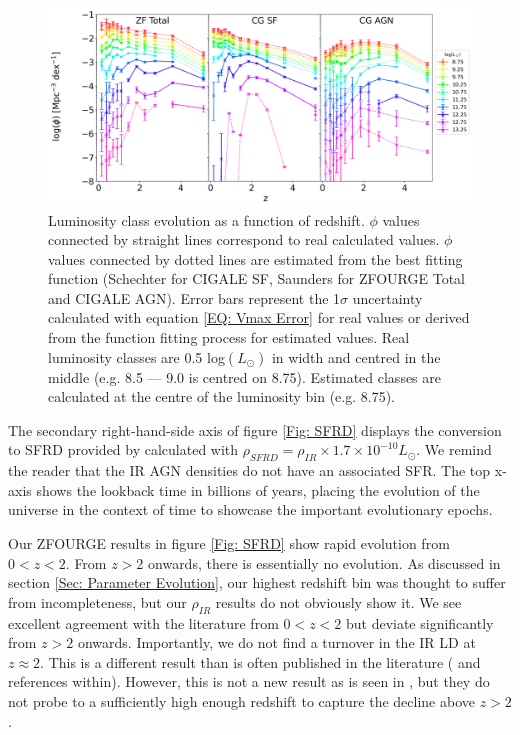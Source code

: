 \begin{figure}
    \centering
    \includegraphics[width=\textwidth]{Figures/Class_Evo.png}
    \caption{Luminosity class evolution as a function of redshift. $\phi$ values connected by straight lines correspond to real calculated values. $\phi$ values connected by dotted lines are estimated from the best fitting function (Schechter for CIGALE SF, Saunders for ZFOURGE Total and CIGALE AGN). Error bars represent the 1$\sigma$ uncertainty calculated with equation \ref{EQ: Vmax Error} for real values or derived from the function fitting process for estimated values. Real luminosity classes are 0.5 log$(L_{\odot})$ in width and centred in the middle (e.g. 8.5 --- 9.0 is centred on 8.75). Estimated classes are calculated at the centre of the luminosity bin (e.g. 8.75).}
    \label{Fig: Class Evo}
\end{figure}

The secondary right-hand-side axis of figure \ref{Fig: SFRD} displays the conversion to SFRD provided by \cite{kennicutt_global_1998} calculated with $\rho_{SFRD} = \rho_{IR} \times 1.7\times10^{-10} L_{\odot}$. We remind the reader that the IR AGN densities do not have an associated SFR. The top x-axis shows the lookback time in billions of years, placing the evolution of the universe in the context of time to showcase the important evolutionary epochs.

Our ZFOURGE results in figure \ref{Fig: SFRD} show rapid evolution from $0<z<2$. From $z>2$ onwards, there is essentially no evolution. As discussed in section \ref{Sec: Parameter Evolution}, our highest redshift bin was thought to suffer from incompleteness, but our $\rho_{IR}$ results do not obviously show it. We see excellent agreement with the literature from $0<z<2$ but deviate significantly from $z>2$ onwards. Importantly, we do not find a turnover in the IR LD at $z\approx2$. This is a different result than is often published in the literature (\citealp{gruppioni_herschel_2013, magnelli_deepest_2013, madau_cosmic_2014, lutz_far-infrared_2014} and references within). However, this is not a new result as is seen in \cite{rodighiero_mid-_2010}, but they do not probe to a sufficiently high enough redshift to capture the decline above $z>2$.

